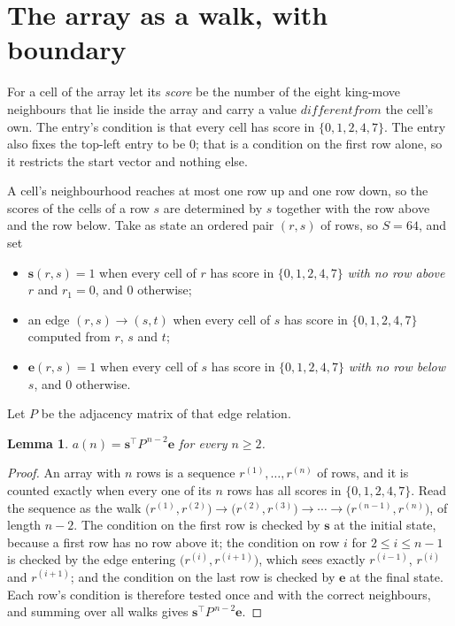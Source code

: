 \documentclass[11pt,a4paper]{article}
\theoremstyle{plain}
\newtheorem{lemma}[theorem]{Lemma}
\theoremstyle{definition}
\begin{document}
\section{The array as a walk, with boundary}

For a cell of the array let its \emph{score} be the number of the eight king-move neighbours that lie inside
the array and carry a value $different from$ the cell's own. The entry's condition is that every cell
has score in $\{0,1,2,4,7\}$. The entry also fixes the top-left entry to be $0$; that is a condition on the first row alone, so it restricts the start vector and nothing else.

A cell's neighbourhood reaches at most one row up and one row down, so the scores of the
cells of a row $s$ are determined by $s$ together with the row above and the row below.
Take as state an ordered pair $(r,s)$ of rows, so $S=64$, and set
\begin{itemize}
\item $\mathbf{s}(r,s)=1$ when every cell of $r$ has score in $\{0,1,2,4,7\}$ \emph{with no row
above $r$} and $r_1=0$, and $0$ otherwise;
\item an edge $(r,s)\to(s,t)$ when every cell of $s$ has score in $\{0,1,2,4,7\}$ computed from
$r$, $s$ and $t$;
\item $\mathbf{e}(r,s)=1$ when every cell of $s$ has score in $\{0,1,2,4,7\}$ \emph{with no row
below $s$}, and $0$ otherwise.
\end{itemize}
Let $P$ be the adjacency matrix of that edge relation.

\begin{lemma}\label{lem:walk}
$a(n)=\mathbf{s}^{\!\top}P^{\,n-2}\mathbf{e}$ for every $n\ge2$.
\end{lemma}

\begin{proof}
An array with $n$ rows is a sequence $r^{(1)},\dots,r^{(n)}$ of rows, and it is counted
exactly when every one of its $n$ rows has all scores in $\{0,1,2,4,7\}$. Read the sequence as the
walk $\bigl(r^{(1)},r^{(2)}\bigr)\to\bigl(r^{(2)},r^{(3)}\bigr)\to\cdots\to
\bigl(r^{(n-1)},r^{(n)}\bigr)$, of length $n-2$. The condition on the first row is
checked by $\mathbf{s}$ at the initial state, because a first row has no row above it; the
condition on row $i$ for $2\le i\le n-1$ is checked by the edge entering
$\bigl(r^{(i)},r^{(i+1)}\bigr)$, which sees exactly $r^{(i-1)}$, $r^{(i)}$ and
$r^{(i+1)}$; and the condition on the last row is checked by $\mathbf{e}$ at the final
state. Each row's condition is therefore tested once and with the correct neighbours, and
summing over all walks gives $\mathbf{s}^{\!\top}P^{\,n-2}\mathbf{e}$.
\end{proof}
\end{document}
